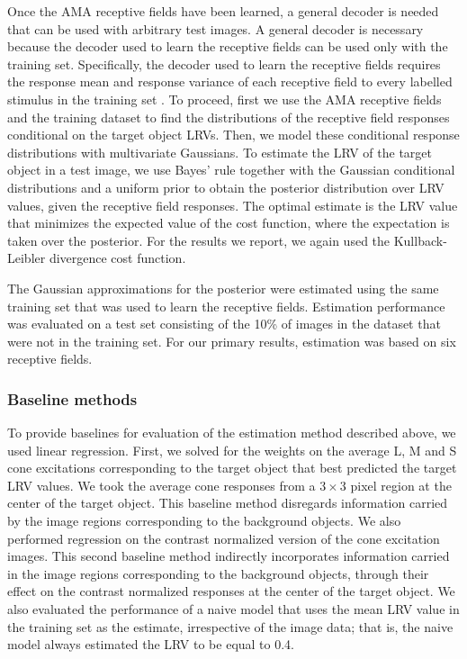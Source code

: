 \documentclass{jov}
\begin{document}
Once the AMA receptive fields have been learned, a general decoder is needed that can be used with arbitrary test images.
A general decoder is necessary because the decoder used to learn the receptive fields can be used only with the training set. Specifically, the decoder used to learn the receptive fields requires the response mean and response variance of each receptive field to every labelled stimulus in the training set \cite{geisler2009optimal,burge2017accuracy}.
To proceed, first we use the AMA receptive fields and the training dataset to find the distributions of the receptive field responses conditional on the target object LRVs.
Then, we model these conditional response distributions with multivariate Gaussians.
To estimate the LRV of the target object in a test image, we use Bayes' rule together with the Gaussian conditional distributions and a uniform prior to obtain the posterior distribution over LRV values, given the receptive field responses.
The optimal estimate is the LRV value that minimizes the expected value of the cost function, where the expectation is taken over the posterior.
For the results we report, we again used the Kullback-Leibler divergence cost function.

The Gaussian approximations for the posterior were estimated using the same training set that was used to learn the receptive fields.
Estimation performance was evaluated on a test set consisting of the 10\% of images in the dataset that were not in the training set.
For our primary results, estimation was based on six receptive fields.

\subsubsection*{Baseline methods}
To provide baselines for evaluation of the estimation method described above, we used linear regression.
First, we solved for the weights on the average L, M and S cone excitations corresponding to the target object that best predicted the target LRV values.
We took the average cone responses from a $3 \times 3$ pixel region at the center of the target object.
This baseline method disregards information carried by the image regions corresponding to the background objects.
We also performed regression on the contrast normalized version of the cone excitation images.
This second baseline method indirectly incorporates information carried in the image regions corresponding to the background objects,
through their effect on the contrast normalized responses at the center of the target object. 
We also evaluated the performance of a naive model that uses the mean LRV value in the training set as the estimate, irrespective
of the image data; that is, the naive model always estimated the LRV to be equal to 0.4.
\end{document}
